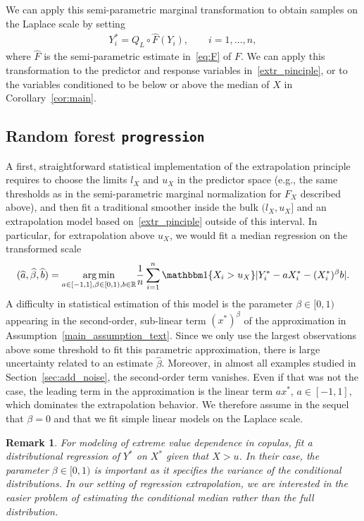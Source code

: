 \documentclass{statsoc}
\newtheorem{remark}{Remark}
\theoremstyle{break}
\DeclareMathOperator{\argmin}{arg\,min}
\newcommand{\einsfun}{\mathbbm 1}
\begin{document}
We can apply this semi-parametric marginal transformation to obtain samples on the Laplace scale by setting 
\begin{align} \label{eq:laplace:trans:emp}
	Y^*_i = Q_L \circ \widehat F(Y_i), \qquad i= 1,\dots, n,
\end{align}
where $\widehat F$ is the semi-parametric estimate in~\eqref{eq:F} of $F$.
We can apply this transformation to the predictor and response variables in~\eqref{extr_pinciple}, or to the variables conditioned to be below or above the median of $X$ in Corollary~\ref{cor:main}.


\subsection{Random forest \texttt{progression}}\label{rf_progression}

A first, straightforward statistical implementation of the extrapolation principle requires to choose the limits $l_X$ and $u_X$ in the predictor space 
(e.g., the same thresholds as in the semi-parametric marginal normalization for $F_X$ described above), 
and then fit a traditional smoother 
inside the bulk $(l_X,u_X]$ and an extrapolation model based on~\eqref{extr_pinciple} outside of this interval.
In particular, for extrapolation above $u_X$, we would fit a median regression on the transformed scale
\begin{align}
	\label{naive}
	(\widehat a, \widehat \beta, \widehat b) = \underset{a\in[-1,1],\beta\in[0,1),b\in\mathbb R}{\argmin}\frac1n \sum_{i=1}^n \einsfun\{X_i > u_X\} |  Y_i^* - a X_i^* - (X_i^*)^\beta b|.
\end{align}
A difficulty in statistical estimation of this model is the parameter $\beta\in[0,1)$ appearing in the second-order, sub-linear term $(x^*)^\beta$ of the approximation in Assumption~\ref{main_assumption_text}. Since we only use the largest observations above some threshold to fit this parametric approximation, there is large uncertainty related to an estimate $\widehat \beta$. Moreover, in almost all examples studied in Section~\ref{sec:add_noise}, the second-order term vanishes. Even if that was not the case, the leading term in the approximation is the linear term $ax^*$, $a\in[-1,1]$, which dominates the extrapolation behavior.
We therefore assume in the sequel that $\beta = 0$ and that we fit simple linear models on the Laplace scale. 
\begin{remark}
	For modeling of extreme value dependence in copulas, \cite{heffernan:tawn:2004} fit a distributional regression of $Y^*$ on $X^*$ given that $X>u$. In their case, the parameter $\beta\in[0,1)$ is important as it specifies the variance of the conditional distributions.
	In our setting of regression extrapolation, we are interested in the easier problem of estimating the conditional median rather than the full distribution.
\end{remark}
\end{document}
